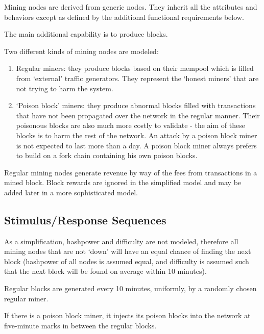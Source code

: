 \documentclass{scrreprt}
\begin{document}
      Mining nodes are derived from generic nodes.
      They inherit all the attributes and behaviors except as defined by the
      additional functional requirements below.

      The main additional capability is to produce blocks.

      Two different kinds of mining nodes are modeled:

      \begin{enumerate}
        \item Regular miners: they produce blocks based on their mempool which
          is filled from `external' traffic generators.
          They represent the `honest miners' that are not trying to harm
          the system.
        \item `Poison block' miners: they produce abnormal blocks filled with
          transactions that have not been propagated over the network in the
          regular manner.
          Their poisonous blocks are also much more costly to validate - the
          aim of these blocks is to harm the rest of the network.
          An attack by a poison block miner is not expected to last more than a day.
          A poison block miner always prefers to build on a fork chain containing his own
          poison blocks.
      \end{enumerate}

      Regular mining nodes generate revenue by way of the fees from
      transactions in a mined block.
      Block rewards are ignored in the simplified model and may be added
      later in a more sophisticated model.

    \subsection{Stimulus/Response Sequences}

      As a simplification, hashpower and difficulty are not modeled, therefore
      all mining nodes that are not `down' will have an equal chance of finding
      the next block (hashpower of all nodes is assumed equal, and difficulty
      is assumed such that the next block will be found on average within 10
      minutes).

      Regular blocks are generated every 10 minutes, uniformly, by a randomly
      chosen regular miner.

      If there is a poison block miner, it injects its poison blocks into the
      network at five-minute marks in between the regular blocks.
\end{document}
